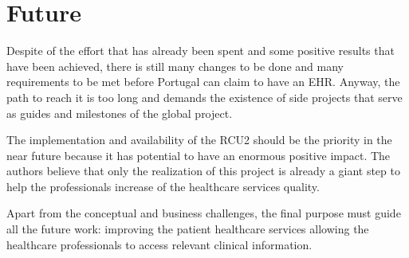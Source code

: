\section{Future}

Despite of the effort that has already been spent and some positive results that have been achieved, there is still many changes to be done and many requirements to be met before Portugal can claim to have an EHR. Anyway, the path to reach it is too long and demands the existence of side projects that serve as guides and milestones of the global project.

The implementation and availability of the RCU2 should be the priority in the near future because it has potential to have an enormous positive impact. The authors believe that only the realization of this project is already a giant step to help the professionals increase of the healthcare services quality.

Apart from the conceptual and business challenges, the final purpose must guide all the future work: improving the patient healthcare services allowing the healthcare professionals to access relevant clinical information.
